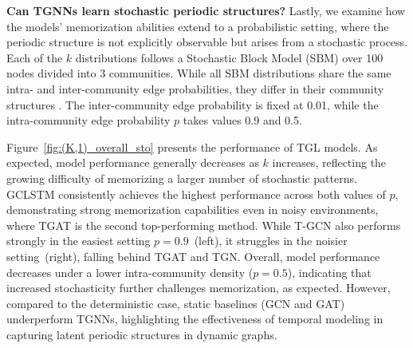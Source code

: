 
 \textbf{Can TGNNs learn stochastic periodic structures?} Lastly, we examine how the models' memorization abilities extend to a probabilistic setting, where the periodic structure is not explicitly observable but arises from a stochastic process. 
Each of the $k$ distributions follows a Stochastic Block Model (SBM) over 100 nodes divided into 3 communities. While all SBM distributions share the same intra- and inter-community edge probabilities, they differ in their community structures
.
The inter-community edge probability is fixed at 0.01, while the intra-community edge probability $p$ takes values 0.9 and 0.5.

Figure~\ref{fig:(K,1)_overall_sto} presents the performance of TGL models. As expected, model performance generally decreases as $k$ increases, reflecting the growing difficulty of memorizing a larger number of stochastic patterns. GCLSTM consistently achieves the highest performance across both values of $p$, demonstrating strong memorization capabilities even in noisy environments, where TGAT is the second top-performing method. While T-GCN also performs strongly in the easiest setting $p=0.9$~(left), it struggles in the noisier setting~(right), falling behind TGAT and TGN. Overall, model performance decreases under a lower intra-community density ($p = 0.5$), 
indicating that increased stochasticity further challenges memorization, as expected. However, compared to the deterministic case, static baselines (GCN and GAT) underperform TGNNs, highlighting the effectiveness of temporal modeling in capturing latent periodic structures in dynamic graphs.

